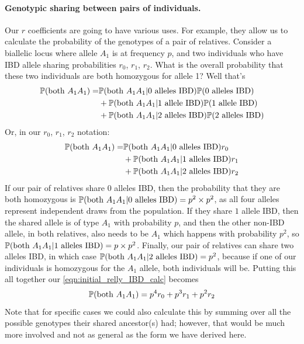 \paragraph{Genotypic sharing between pairs of individuals.}
Our $r$ coefficients are going to have various uses. For example, they allow us
to calculate the probability of the genotypes of a pair of
relatives. Consider a biallelic locus where allele $A_1$ is
at frequency $p$, and two individuals who have IBD allele sharing
probabilities $r_0$, $r_1$, $r_2$. What is the overall probability that these
two individuals are both homozygous for allele 1? Well that's
\begin{align}
  \P(\textrm{both } A_1 A_1) = & \P(\textrm{both } A_1 A_1 | \text{0 alleles IBD}) \P(\text{0 alleles IBD})  \nonumber\\
  & + \P(\textrm{both } A_1 A_1 | \text{1 allele IBD}) \P(\text{1 allele IBD})  \nonumber\\
  &+ \P(\textrm{both } A_1 A_1 | \text{2 alleles IBD}) \P(\text{2 alleles IBD})
\end{align}
Or, in our $r_0$, $r_1$, $r_2$ notation:
\begin{align}
  \P(\textrm{both } A_1 A_1) = & \P(\textrm{both } A_1 A_1 | \text{0 alleles IBD}) r_0  \nonumber\\
  & + \P(\textrm{both } A_1 A_1 |
  \text{1 alleles IBD}) r_1  \nonumber\\
  & + \P(\textrm{both } A_1 A_1 | \text{2 alleles IBD}) r_2 \label{eqn:initial_relly_IBD_calc}
\end{align}
If our pair of relatives share $0$ alleles IBD, then the probability that
they are both homozygous is $\P(\textrm{both } A_1 A_1 |
\text{0 alleles IBD}) =p^2 \times p^2$, as all four alleles
represent independent draws from the population. If they share $1$
allele IBD, then the shared allele is of type $A_1$ with probability $p$, and then
the other non-IBD allele, in both relatives, also needs
to be $A_1$ which happens with probability $p^2$, so $\P(\textrm{both } A_1 A_1 |
\text{1 alleles IBD})=p \times p^2$. Finally, our pair of relatives can
share two alleles IBD, in which case $\P(\textrm{both } A_1 A_1 | \text{2 alleles IBD})
= p^2$, because if one of our individuals is homozygous for the $A_1$ allele,
both individuals will be. Putting this all together our \eqn
\eqref{eqn:initial_relly_IBD_calc} becomes
\begin{equation}
\P(\textrm{both } A_1 A_1) = p^4 r_0 + p^3 r_1 + p^2 r_2 \label{eqn:IBD_relly_calc}
\end{equation}
Note that for specific cases we could also calculate this by summing over all the
possible genotypes their shared ancestor(s) had; however, that would be much more
involved and not as general as the form we have derived here.

